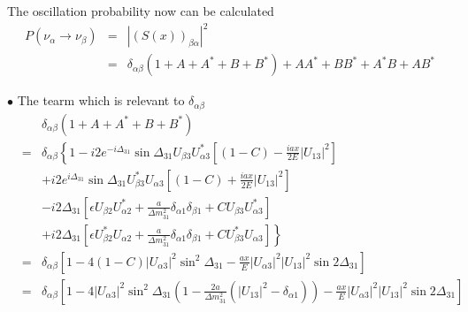 \documentclass[a4 paper,12pt]{report}%
\begin{document}
The oscillation probability now can be calculated 
 \begin{eqnarray}\label{70} \nonumber
P(\nu_\alpha \rightarrow \nu_\beta) &=& |(S(x))_{\beta\alpha}|^2 \\ 
&=& \delta_{\alpha\beta}(1 + A + A^* + B + B^*) + AA^* + BB^* + A^*B + AB^*
\end{eqnarray}\par
$\bullet$ The tearm which is relevant to $\delta_{\alpha\beta}$
 \begin{eqnarray} \nonumber
&&\delta_{\alpha\beta}(1 + A + A^* + B + B^*)\\ \nonumber
&=&\delta_{\alpha\beta}\left\{ 1 - i2e^{-i\Delta_{31}}\sin\Delta_{31}U_{\beta 3}U^*_{\alpha 3}\left[(1-C)-\frac{iax}{2E}|U_{13}|^2\right]\right. \\  \nonumber
&&  + i2e^{i\Delta_{31}}\sin\Delta_{31}U^*_{\beta 3}U_{\alpha 3}\left[(1-C)+\frac{iax}{2E}|U_{13}|^2\right] \\ \nonumber
&&-i2\Delta_{31}\left[\epsilon U_{\beta 2}U^*_{\alpha 2}+\frac{a}{\Delta m^2_{31}}\delta_{\alpha 1}\delta_{\beta 1}+CU_{\beta 3}U^*_{\alpha 3}\right] \\ \nonumber
&&\left.+i2\Delta_{31}\left[\epsilon U^*_{\beta 2}U_{\alpha 2}+\frac{a}{\Delta m^2_{31}}\delta_{\alpha 1}\delta_{\beta 1}+CU^*_{\beta 3}U_{\alpha 3}\right] \right\}\\ \nonumber
&=&\delta_{\alpha\beta}\left[ 1- 4(1-C)|U_{\alpha 3}|^2\sin^2\Delta_{31}-\frac{ax}{E}|U_{\alpha 3}|^2|U_{13}|^2\sin2\Delta_{31}\right]\\ \nonumber
&=&\delta_{\alpha\beta}\left[ 1- 4|U_{\alpha 3}|^2\sin^2\Delta_{31}\left(1-\frac{2a}{\Delta m^2_{31}}(|U_{13}|^2-\delta_{\alpha 1})\right)-\frac{ax}{E}|U_{\alpha 3}|^2|U_{13}|^2\sin2\Delta_{31}\right]
\end{eqnarray}
\end{document}
